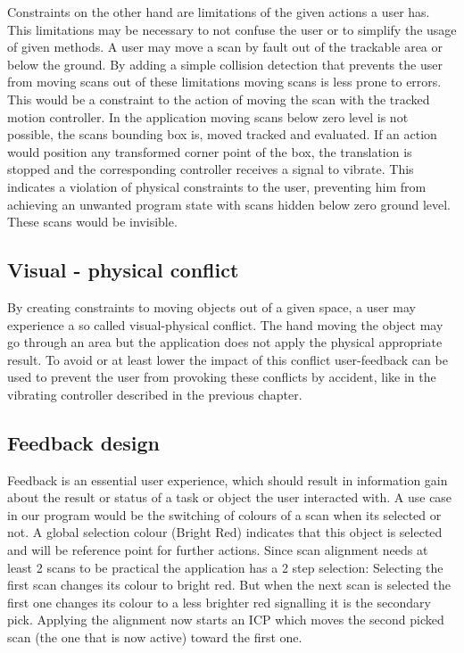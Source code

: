 \documentclass[hyperref,english,bachelorofscience,bibnum]{cgvpub}
\begin{document}
Constraints on the other hand are limitations of the given actions a user has. This limitations may be necessary to not confuse the user or to simplify the usage of given methods. A user may move a scan by fault out of the trackable area or below the ground. By adding a simple collision detection that prevents the user from moving scans out of these limitations moving scans is less prone to errors. This would be a constraint to the action of moving the scan with the tracked motion controller. In the application moving scans below zero level is not possible, the scans bounding box is, moved tracked and evaluated. If an action would position any transformed corner point of the box, the translation is stopped and the corresponding controller receives a signal to vibrate. This indicates a violation of physical constraints to the user, preventing him from achieving an unwanted program state with scans hidden below zero ground level. These scans would be invisible.

\subsection{Visual - physical conflict}

By creating constraints to moving objects out of a given space, a user may experience a so called visual-physical conflict. The hand moving the object may go through an area but the application does not apply the physical appropriate result\cite{Jerald2015}.
To avoid or at least lower the impact of this conflict user-feedback can be used to prevent the user from provoking these conflicts by accident, like in the vibrating controller described in the previous chapter.

\subsection{Feedback design}

Feedback is an essential user experience, which should result in information gain about the result or status of a task or object the user interacted with\cite{Jerald}.
A use case in our program would be the switching of colours of a scan when its selected or not. A global selection colour (Bright Red) indicates that this object is selected and will be reference point for further actions. Since scan alignment needs at least 2 scans to be practical the application has a 2 step selection:
Selecting the first scan changes its colour to bright red. But when the next scan is selected the first one changes its colour to a less brighter red signalling it is the secondary pick. Applying the alignment now starts an ICP which moves the second picked scan (the one that is now active) toward the first one.
\end{document}
